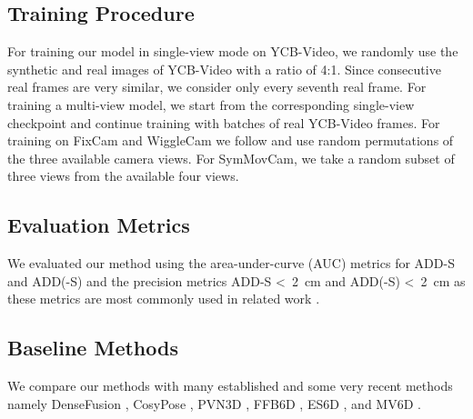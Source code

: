\subsection{Training Procedure}

For training our model in single-view mode on YCB-Video, we randomly use the synthetic and real images of YCB-Video with a ratio of 4:1. Since consecutive real frames are very similar, we consider only every seventh real frame. For training a multi-view model, we start from the corresponding single-view checkpoint and continue training with batches of real YCB-Video frames. 
For training on FixCam and WiggleCam we follow \cite{mv6d} and use random permutations of the three available camera views. For SymMovCam, we take a random subset of three views from the available four views.



\subsection{Evaluation Metrics}
\label{sec_eval_metrics}

We evaluated our method using the area-under-curve (AUC) metrics for ADD-S and \mbox{ADD(-S)} and the precision metrics ADD-S \textless ~\SI{2}{cm} and \mbox{ADD(-S)} \textless ~\SI{2}{cm} as these metrics are most commonly used in related work \cite{cosypose, ffb6d, mv6d}. 



\subsection{Baseline Methods}

We compare our methods with many established and some very recent methods namely 
DenseFusion \cite{densefusion}, CosyPose \cite{cosypose}, PVN3D \cite{pvn3d}, FFB6D \cite{ffb6d}, ES6D \cite{es6d}, and MV6D \cite{mv6d}.
